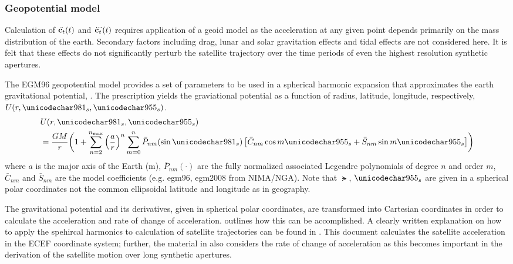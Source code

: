 \subsubsection{Geopotential model}
Calculation of $\ddot{\mathbf{c}_t}(t)$ and $\dddot{\mathbf{c}_t}(t)$ requires application of a geoid model as the acceleration at any given point depends primarily on the mass distribution of the earth. Secondary factors including drag, lunar and solar gravitation effects and tidal effects are not considered here. It is felt that these effects do not significantly perturb the satellite trajectory over the time periods of even the highest resolution synthetic apertures. 
\par
The EGM96 geopotential model provides a set of parameters to be used in a spherical harmonic expansion that approximates the earth gravitational potential, \cite{NASAEGM86}. The prescription yields the graviational potential as a function of radius, latitude, longitude, respectively, $U(r, \lat, \lng)$. 
\begin{equation}
\begin{split}
 &U(r, \lat, \lng)\\ &= \frac{GM}{r}\biggl(1+\sum_{n=2}^{n_{\text{max}}}\left(\frac{a}{r}\right)^n\sum_{m=0}^n\bar{P}_{nm}(\sin\lat)\left[\bar{C}_{nm}\cos{m\lng} + \bar{S}_{nm}\sin{m\lng}\right]\biggr)
\end{split}
\label{eq:egm96model}
\end{equation}
where $a$ is the major axis of the Earth (m), $\bar{P}_{nm}(\cdot)$ are the fully normalized associated Legendre polynomials of degree $n$ and order $m$, $\bar{C}_{nm}$ and $\bar{S}_{nm}$ are the model coefficients (e.g. egm96, egm2008 from NIMA/NGA). 
Note that $\lat$, $\lng$ are given in a spherical polar coordinates not the common ellipsoidal latitude and longitude as in geography. 
\par
The gravitational potential and its derivatives, given in spherical polar coordinates, are transformed into Cartesian coordinates in order to calculate the acceleration and rate of change of acceleration.  outlines how this can be accomplished. A clearly written explanation on how to apply the spehircal harmonics to calculation of satellite trajectories can be found in \cite{Shou2014}. This document calculates the satellite acceleration in the ECEF coordinate system; further, the material in  also considers the rate of change of acceleration as this becomes important in the derivation of the satellite motion over long synthetic apertures.
\par
